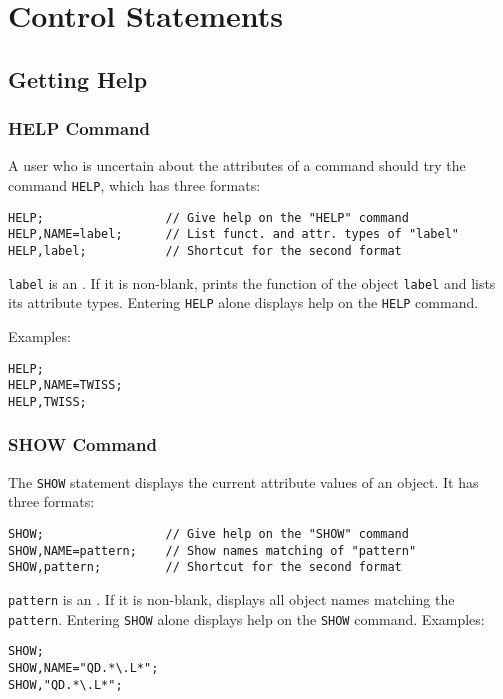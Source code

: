 \chapter{Control Statements}
\label{sec:control}

\section{Getting Help}

\subsection{HELP Command}
\label{sec:help}
A user who is uncertain about the attributes of a command
should try the command \texttt{HELP}, which has three formats:
\begin{verbatim}
HELP;                 // Give help on the "HELP" command
HELP,NAME=label;      // List funct. and attr. types of "label"
HELP,label;           // Shortcut for the second format
\end{verbatim}
\texttt{label} is an .
If it is non-blank,
\opal prints the function of the object \texttt{label} and lists its
attribute types.
Entering \texttt{HELP} alone displays help on the \texttt{HELP}
command. 

\noindent Examples:
\begin{verbatim}
HELP;
HELP,NAME=TWISS;
HELP,TWISS;
\end{verbatim}

\subsection{SHOW Command}
\label{sec:show}
The \texttt{SHOW} statement displays the current attribute values
of an object.
It has three formats:
\begin{verbatim}
SHOW;                 // Give help on the "SHOW" command
SHOW,NAME=pattern;    // Show names matching of "pattern"
SHOW,pattern;         // Shortcut for the second format
\end{verbatim}
\texttt{pattern} is an .
If it is non-blank,
\opal displays all object names matching the \texttt{pattern}.
Entering \texttt{SHOW} alone displays help on the \texttt{SHOW}
command. 
\noindent Examples:
\begin{verbatim}
SHOW;
SHOW,NAME="QD.*\.L*";
SHOW,"QD.*\.L*";
\end{verbatim}

